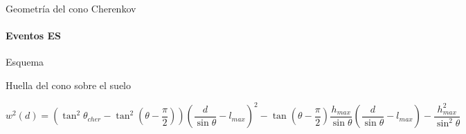 \begin{frame}{Geometr\'ia del cono Cherenkov}
\framesubtitle{Eventos ES}
\footnotesize
	\begin{block}{Esquema}
		\begin{center}
		\end{center}
	\end{block}
	\begin{alertblock}{Huella del cono sobre el suelo}
		\begin{center}
		 \begin{displaymath}
			w^2(d)=
			(\tan^2 \theta_{cher}-\tan^2 (\theta-\frac{\pi}{2}))
			(\frac{d}{\sin \theta}-l_{max})^2
			- \tan (\theta-\frac{\pi}{2}) \frac{h_{max}}{\sin \theta} (\frac{d}{\sin \theta}-l_{max})
			- \frac{h_{max}^2}{\sin^2 \theta}
		 \end{displaymath}
		\end{center}
	\end{alertblock}
\end{frame}